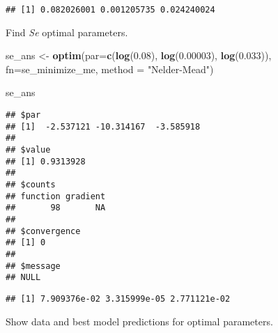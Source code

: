 \documentclass[]{article}
\newenvironment{Shaded}{\begin{snugshade}}{\end{snugshade}}
\newcommand{\KeywordTok}[1]{\textcolor[rgb]{0.13,0.29,0.53}{\textbf{#1}}}
\newcommand{\DataTypeTok}[1]{\textcolor[rgb]{0.13,0.29,0.53}{#1}}
\newcommand{\FloatTok}[1]{\textcolor[rgb]{0.00,0.00,0.81}{#1}}
\newcommand{\StringTok}[1]{\textcolor[rgb]{0.31,0.60,0.02}{#1}}
\newcommand{\OperatorTok}[1]{\textcolor[rgb]{0.81,0.36,0.00}{\textbf{#1}}}
\newcommand{\NormalTok}[1]{#1}
\begin{document}
\begin{Shaded}
\end{Shaded}

\begin{verbatim}
## [1] 0.082026001 0.001205735 0.024240024
\end{verbatim}

Find \emph{Se} optimal parameters.

\begin{Shaded}
\begin{Highlighting}[]
\NormalTok{se_ans <-}\StringTok{ }\KeywordTok{optim}\NormalTok{(}\DataTypeTok{par=}\KeywordTok{c}\NormalTok{(}\KeywordTok{log}\NormalTok{(}\FloatTok{0.08}\NormalTok{), }\KeywordTok{log}\NormalTok{(}\FloatTok{0.00003}\NormalTok{), }\KeywordTok{log}\NormalTok{(}\FloatTok{0.033}\NormalTok{)), }
             \DataTypeTok{fn=}\NormalTok{se_minimize_me,}
             \DataTypeTok{method =} \StringTok{"Nelder-Mead"}\NormalTok{)}

\NormalTok{se_ans}
\end{Highlighting}
\end{Shaded}

\begin{verbatim}
## $par
## [1]  -2.537121 -10.314167  -3.585918
## 
## $value
## [1] 0.9313928
## 
## $counts
## function gradient 
##       98       NA 
## 
## $convergence
## [1] 0
## 
## $message
## NULL
\end{verbatim}

\begin{Shaded}
\end{Shaded}

\begin{verbatim}
## [1] 7.909376e-02 3.315999e-05 2.771121e-02
\end{verbatim}

Show data and best model predictions for optimal parameters.
\end{document}

